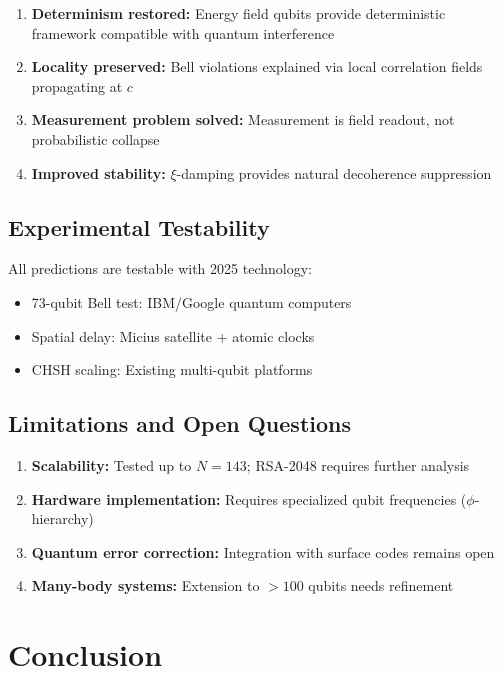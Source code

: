 \begin{enumerate}
	\item \textbf{Determinism restored:} Energy field qubits provide deterministic framework compatible with quantum interference
	\item \textbf{Locality preserved:} Bell violations explained via local correlation fields propagating at $c$
	\item \textbf{Measurement problem solved:} Measurement is field readout, not probabilistic collapse
	\item \textbf{Improved stability:} $\xi$-damping provides natural decoherence suppression
\end{enumerate}

\subsection{Experimental Testability}

All predictions are testable with 2025 technology:
\begin{itemize}
	\item 73-qubit Bell test: IBM/Google quantum computers
	\item Spatial delay: Micius satellite + atomic clocks
	\item CHSH scaling: Existing multi-qubit platforms
\end{itemize}

\subsection{Limitations and Open Questions}

\begin{enumerate}
	\item \textbf{Scalability:} Tested up to $N=143$; RSA-2048 requires further analysis
	\item \textbf{Hardware implementation:} Requires specialized qubit frequencies ($\phi$-hierarchy)
	\item \textbf{Quantum error correction:} Integration with surface codes remains open
	\item \textbf{Many-body systems:} Extension to $>100$ qubits needs refinement
\end{enumerate}

\section{Conclusion}

